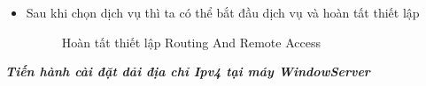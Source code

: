 \begin{itemize}
\item Sau khi chọn dịch vụ thì ta có thể bắt đầu dịch vụ và hoàn tất thiết lập

        \begin{figure}[htbp]
            \hfill
            \hfill
            \caption{Hoàn tất thiết lập Routing And Remote Access}
        \end{figure}

\end{itemize}

 \textbf{\textit{Tiến hành cài đặt dải địa chỉ Ipv4 tại máy WindowServer}}

